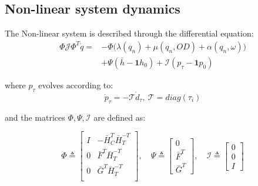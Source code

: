 \subsection{Non-linear system dynamics}
The Non-linear system is described through the differential equation:
\begin{equation}\label{eq:NonLinearModelWithTank}
	\begin{split}
			\Phi\mathcal{J}\Phi^T \dot{q} = &-\Phi\Big(\lambda(q_n)+\mu(q_n,OD)+\alpha(q_n,\omega)\Big)\\ 
			&+ \Psi(\bar{h}-\mathbf{1}h_0) + \mathcal{I}(p_{\tau}-\mathbf{1}p_0)
	\end{split}
\end{equation}

where $p_{\tau}$ evolves according to:
\begin{equation}\label{eq:TankDynamics}
	\dot{p}_{\tau} = - \mathcal{T} \dot{d}_{\tau}, \ \mathcal{T} = diag(\tau_i)
\end{equation}

and the matrices $\Phi, \Psi, \mathcal{I}$ are defined as:

\begin{equation}\label{eq:NonLinearModelMatrices}
	\Phi \triangleq 
	\begin{bmatrix} 
		I & -\bar{H}_C^T\bar{H}_T^{-T} \\ 0 & \bar{F}^T\bar{H}_T^{-T} \\ 0  & \bar{G}^T\bar{H}_T^{-T} \\ 
	\end{bmatrix}
	, \quad
	\Psi \triangleq
	\begin{bmatrix}
		0 \\ \bar{F}^T \\ \bar{G}^T
	\end{bmatrix}
	, \quad
	\mathcal{I} \triangleq
	\begin{bmatrix}
		0 \\ 0 \\ I
	\end{bmatrix}
\end{equation}